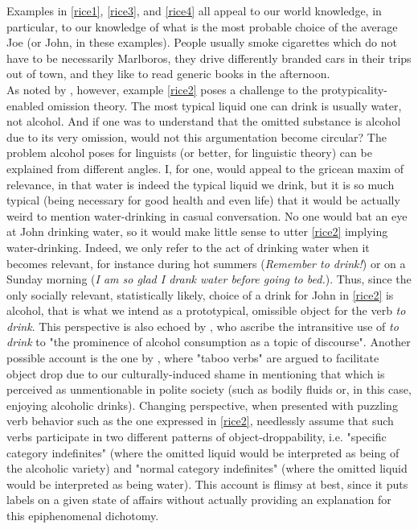 Examples in \ref{rice1}, \ref{rice3}, and \ref{rice4} all appeal to our world knowledge, in particular, to our knowledge of what is the most probable choice of the average Joe (or John, in these examples). People usually smoke cigarettes which do not have to be necessarily Marlboros, they drive differently branded cars in their trips out of town, and they like to read generic books in the afternoon.\\
As noted by \textcite[125]{Naess2007}, however, example \ref{rice2} poses a challenge to the protypicality-enabled omission theory. The most typical liquid one can drink is usually water, not alcohol. And if one was to understand that the omitted substance is alcohol due to its very omission, would not this argumentation become circular? The problem alcohol poses for linguists (or better, for linguistic theory) can be explained from different angles. I, for one, would appeal to the gricean maxim of relevance, in that water is indeed the typical liquid we drink, but it is so much typical (being necessary for good health and even life) that it would be actually weird to mention water-drinking in casual conversation. No one would bat an eye at John drinking water, so it would make little sense to utter \ref{rice2} implying water-drinking. Indeed, we only refer to the act of drinking water when it becomes relevant, for instance during hot summers (\textit{Remember to drink!}) or on a Sunday morning (\textit{I am so glad I drank water before going to bed.}). Thus, since the only socially relevant, statistically likely, choice of a drink for John in \ref{rice2} is alcohol, that is what we intend as a prototypical, omissible object for the verb \textit{to drink}. This perspective is also echoed by \textcite[14]{NewmanRice2006}, who ascribe the intransitive use of \textit{to drink} to "the prominence of alcohol consumption as a topic of discourse". Another possible account is the one by \textcite[21-28]{Goldberg2005}, where "taboo verbs" are argued to facilitate object drop due to our culturally-induced shame in mentioning that which is perceived as unmentionable in polite society (such as bodily fluids or, in this case, enjoying alcoholic drinks).  Changing perspective, when presented with puzzling verb behavior such as the one expressed in \ref{rice2}, \textcite[303-305]{HuddlestonEtAl2002} needlessly assume that such verbs participate in two different patterns of object-droppability, i.e. "specific category indefinites" (where the omitted liquid would be interpreted as being of the alcoholic variety) and "normal category indefinites" (where the omitted liquid would be interpreted as being water). This account is flimsy at best, since it puts labels on a given state of affairs without actually providing an explanation for this epiphenomenal dichotomy. 